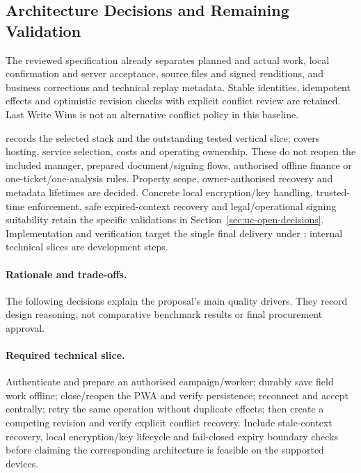 \subsection{Architecture Decisions and Remaining Validation}
The reviewed specification already separates planned and actual work, local
confirmation and server acceptance, source files and signed renditions, and
business corrections and technical replay metadata. Stable identities, idempotent
effects and optimistic revision checks with explicit conflict review are retained.
Last Write Wins is not an alternative conflict policy in this baseline.

 records the selected stack and the outstanding tested vertical slice;  covers hosting, service selection,
costs and operating ownership. These do not reopen the included manager, prepared
document/signing flows, authorised offline finance or one-ticket/one-analysis rules.
Property scope, owner-authorised recovery and metadata lifetimes are decided.
Concrete local encryption/key handling, trusted-time enforcement, safe expired-context
recovery and legal/operational signing suitability retain the specific validations
in Section~\ref{sec:uc-open-decisions}.
Implementation and verification target the single final delivery under
; internal technical slices are development steps.

\paragraph{Rationale and trade-offs.}
The following decisions explain the proposal's main quality drivers. They record
design reasoning, not comparative benchmark results or final procurement approval.


\paragraph{Required technical slice.}
Authenticate and prepare an authorised campaign/worker; durably save field work
offline; close/reopen the PWA and verify persistence; reconnect and accept centrally;
retry the same operation without duplicate effects; then create a competing revision
and verify explicit conflict recovery. Include stale-context recovery, local
encryption/key lifecycle and fail-closed expiry boundary checks before claiming
the corresponding architecture is feasible on the supported devices.


